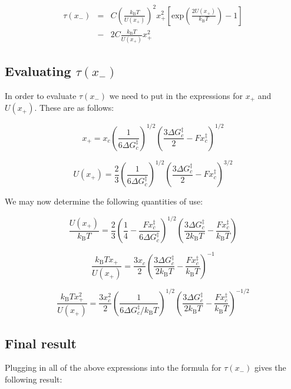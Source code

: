 \documentclass[twocolumn,pre,aps,showpacs,a4paper,floatfix,amssymb]{revtex4-1}
\begin{document}
\begin{eqnarray}
\tau(x_-) &=& C\left(\frac{k_\text{B}T}{U(x_+)}\right)^2 x^2_+ \left[\text{exp}\left(\frac{2U(x_+)}{k_\text{B}T}\right) - 1\right] \nonumber \\ &-& 2C\frac{k_\text{B}T}{U(x_+)}x_+^2
\end{eqnarray}

\subsection{Evaluating $\tau(x_-)$}
In order to evaluate $\tau(x_-)$ we need to put in the expressions for $x_+$ and $U(x_+)$. These are as follows:

\begin{equation}
x_+ = x_c\left(\frac{1}{6\Delta G_c^\ddagger}\right)^{1/2}\left(\frac{3\Delta G_c^\ddagger}{2} - Fx_c^\ddagger\right)^{1/2}
\end{equation}

\begin{equation}
U(x_+) = \frac{2}{3}\left(\frac{1}{6\Delta G_c^\ddagger}\right)^{1/2}\left(\frac{3\Delta G_c^\ddagger}{2} - Fx_c^\ddagger\right)^{3/2}
\end{equation}

\par
\noindent We may now determine the following quantities of use:

\begin{equation}
\frac{U(x_+)}{k_\text{B}T} = \frac{2}{3}\left(\frac{1}{4} - \frac{Fx_c^\ddagger}{6\Delta G_c^\ddagger}\right)^{1/2}\left(\frac{3\Delta G_c^\ddagger}{2k_\text{B}T} - \frac{Fx_c^\ddagger}{k_\text{B}T}\right)
\end{equation}

\begin{equation}
\frac{k_\text{B}Tx_+}{U(x_+)} = \frac{3x_c}{2}\left(\frac{3\Delta G_c^\ddagger}{2k_\text{B}T} - \frac{Fx_c^\ddagger}{k_\text{B}T}\right)^{-1}
\end{equation}

\begin{equation}
\frac{k_\text{B}Tx_+^2}{U(x_+)} = \frac{3x_c^2}{2}\left(\frac{1}{6\Delta G_c^\ddagger/k_\text{B}T}\right)^{1/2}\left(\frac{3\Delta G_c^\ddagger}{2k_\text{B}T} - \frac{Fx_c^\ddagger}{k_\text{B}T}\right)^{-1/2}
\end{equation}

\subsection{Final result}
Plugging in all of the above expressions into the formula for $\tau(x_-)$ gives the following result:
\end{document}
